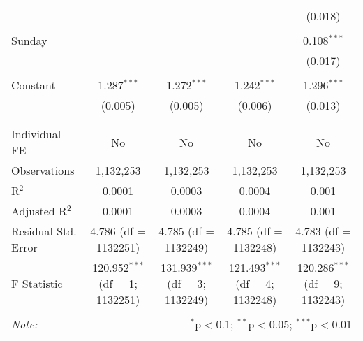 \documentclass[
]{article}
\begin{document}
\begin{table}[!htbp]
{\begin{tabular}{@{\extracolsep{5pt}}lcccc}
  &  &  &  & (0.018) \\ 
  & & & & \\ 
 Sunday &  &  &  & 0.108$^{***}$ \\ 
  &  &  &  & (0.017) \\ 
  & & & & \\ 
 Constant & 1.287$^{***}$ & 1.272$^{***}$ & 1.242$^{***}$ & 1.296$^{***}$ \\ 
  & (0.005) & (0.005) & (0.006) & (0.013) \\ 
  & & & & \\ 
\hline \\[-1.8ex] 
Individual FE & No & No & No & No \\ 
Observations & 1,132,253 & 1,132,253 & 1,132,253 & 1,132,253 \\ 
R$^{2}$ & 0.0001 & 0.0003 & 0.0004 & 0.001 \\ 
Adjusted R$^{2}$ & 0.0001 & 0.0003 & 0.0004 & 0.001 \\ 
Residual Std. Error & 4.786 (df = 1132251) & 4.785 (df = 1132249) & 4.785 (df = 1132248) & 4.783 (df = 1132243) \\ 
F Statistic & 120.952$^{***}$ (df = 1; 1132251) & 131.939$^{***}$ (df = 3; 1132249) & 121.493$^{***}$ (df = 4; 1132248) & 120.286$^{***}$ (df = 9; 1132243) \\ 
\hline 
\hline \\[-1.8ex] 
\textit{Note:}  & \multicolumn{4}{r}{$^{*}$p$<$0.1; $^{**}$p$<$0.05; $^{***}$p$<$0.01} \\ 
\end{tabular}
} 
\end{table} 
\newpage
\end{document}

